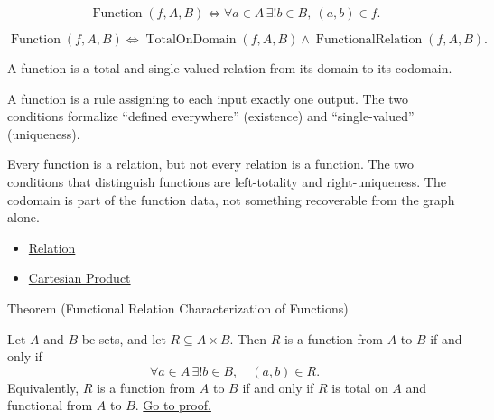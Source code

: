\begin{remark*}
\[
  \operatorname{Function}(f,A,B)
  \iff
  \forall a\in A\,\exists! b\in B,\ (a,b)\in f.
\]
\end{remark*}

\begin{remark*}
\[
  \operatorname{Function}(f,A,B)
  \iff
  \operatorname{TotalOnDomain}(f,A,B)\wedge
  \operatorname{FunctionalRelation}(f,A,B).
\]
\end{remark*}

\begin{remark*}[Interpretation]
A function is a total and single-valued relation from its domain to its
codomain.
\end{remark*}

\begin{remark*}[Exposition]
A function is a rule assigning to each input exactly one output. The two
conditions formalize ``defined everywhere'' (existence) and ``single-valued''
(uniqueness).
\end{remark*}

\begin{remark*}[Exposition]
Every function is a relation, but not every relation is a function. The two
conditions that distinguish functions are left-totality and right-uniqueness.
The codomain is part of the function data, not something recoverable from the
graph alone.
\end{remark*}

\begin{dependencies}
\begin{itemize}
  \item \hyperref[def:relation]{Relation}
  \item \hyperref[def:cartesian-product-rel]{Cartesian Product}
\end{itemize}
\end{dependencies}

\begin{theorembox}{Theorem (Functional Relation Characterization of Functions)}
\begin{theorem}\label{thm:function-total-functional-characterization}
Let $A$ and $B$ be sets, and let $R\subseteq A\times B$. Then $R$ is a
function from $A$ to $B$ if and only if
\[
\forall a\in A\,\exists! b\in B,\quad (a,b)\in R.
\]
Equivalently, $R$ is a function from $A$ to $B$ if and only if $R$ is total
on $A$ and functional from $A$ to $B$.
\hyperref[prf:function-total-functional-characterization]{Go to proof.}
\end{theorem}
\end{theorembox}

